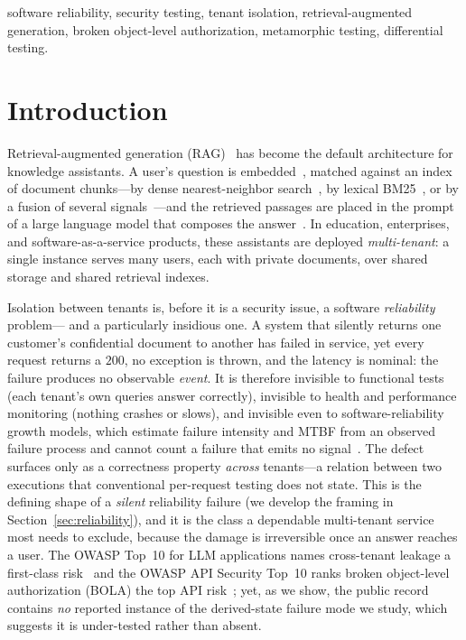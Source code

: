 \IfFileExists{IEEEtran.cls}{\documentclass[conference]{IEEEtran}}{\documentclass[10pt,twocolumn]{article}}
\begin{document}
\begin{IEEEkeywords}
software reliability, security testing, tenant isolation, retrieval-augmented generation, broken
object-level authorization, metamorphic testing, differential testing.
\end{IEEEkeywords}

\section{Introduction}
\label{sec:intro}
Retrieval-augmented generation (RAG)~\cite{lewis2020rag} has become the default architecture for
knowledge assistants. A user's question is embedded~\cite{reimers2019sbert,karpukhin2020dpr},
matched against an index of document chunks---by dense nearest-neighbor
search~\cite{malkov2020hnsw,johnson2021faiss}, by lexical BM25~\cite{robertson2009bm25}, or by a
fusion of several signals~\cite{cormack2009rrf}---and the retrieved passages are placed in the prompt of a large
language model that composes the answer~\cite{izacard2021fid}. In education, enterprises, and
software-as-a-service products, these assistants are deployed \emph{multi-tenant}: a single instance
serves many users, each with private documents, over shared storage and shared retrieval indexes.

Isolation between tenants is, before it is a security issue, a software \emph{reliability} problem---
and a particularly insidious one. A system that silently returns one customer's confidential document
to another has failed in service, yet every request returns a $200$, no exception is thrown, and the
latency is nominal: the failure produces no observable \emph{event}. It is therefore invisible to
functional tests (each tenant's own queries answer correctly), invisible to health and performance
monitoring (nothing crashes or slows), and invisible even to software-reliability growth models,
which estimate failure intensity and MTBF from an observed failure process and cannot count a failure
that emits no signal~\cite{jia2011mutation}. The defect surfaces only as a correctness property
\emph{across} tenants---a relation between two executions that conventional per-request testing does
not state. This is the defining shape of a \emph{silent} reliability failure (we develop the framing
in Section~\ref{sec:reliability}), and it is the class a dependable multi-tenant service most needs to
exclude, because the damage is irreversible once an answer reaches a user. The OWASP Top~10 for LLM
applications names cross-tenant leakage a first-class risk~\cite{owasp2025llm} and the OWASP API
Security Top~10 ranks broken object-level authorization (BOLA) the top API risk~\cite{owasp2023api};
yet, as we show, the public record contains \emph{no} reported instance of the derived-state failure
mode we study, which suggests it is under-tested rather than absent.
\end{document}
